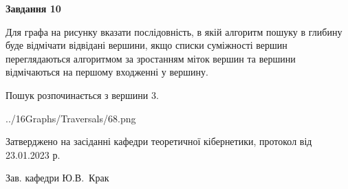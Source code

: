 \documentclass[12pt, ukrainian]{article}
\begin{document}
{\begin {large}
{\begin {center}\textbf{Завдання 10}\end {center}}\par
Для графа на рисунку вказати послідовність, в якій алгоритм пошуку в глибину буде відмічати відвідані вершини, якщо списки суміжності вершин переглядаються алгоритмом за зростанням міток вершин та вершини відмічаються на першому вход\-женні у вершину.\par
Пошук розпочинається з вершини 3.\par

\begin{center}
	{../16Graphs/Traversals/68.png}
\end{center}\par
\newpage


\end {large}
}
{\smallskip \begin {small} Затверджено на засіданні кафедри теоретичної кібернетики, протокол  від   23.01.2023 р.\par\smallskip\smallskip
{\parbox {6.5 cm}{Зав. кафедри \dotfill Ю.В.~Крак}} \end{small}}
\end{document}
